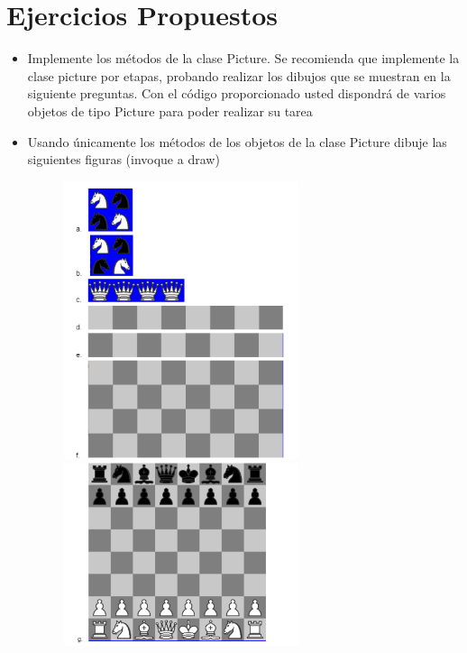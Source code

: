 \documentclass{article}
\begin{document}
	\section{Ejercicios Propuestos}
	\begin{itemize}	
	
		\item Implemente los métodos de la clase Picture. Se recomienda que implemente la clase picture por etapas, probando realizar los dibujos que se muestran en la siguiente preguntas.
		Con el código proporcionado usted dispondrá de varios objetos de tipo Picture para poder realizar su tarea
		
		
		\item Usando únicamente los métodos de los objetos de la clase Picture dibuje las siguientes figuras (invoque a draw)
		\begin{figure}[H]
			\centering
			\includegraphics[width=0.65\textwidth, keepaspectratio]{img/figura1}
			\includegraphics[width=0.65\textwidth, keepaspectratio]{img/figura2}
		\end{figure}
	\end{itemize}
	
\end{document}
